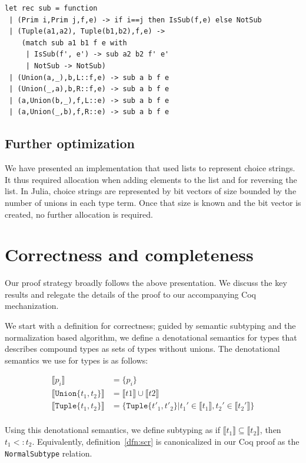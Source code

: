 \documentclass[a4paper,english]{lipics-v2019}
\newcommand{\xt}[1]{\texttt{#1}}
\newcommand{\tuplet}[2]{\xt{Tuple\{}#1,#2\xt{\}}}
\newcommand{\union}[2]{\xt{Union\{}#1,#2\xt{\}}}
\newcommand{\denotes}[1]{\llbracket #1 \rrbracket}
\begin{document}
\begin{lstlisting}
let rec sub = function
 | (Prim i,Prim j,f,e) -> if i==j then IsSub(f,e) else NotSub
 | (Tuple(a1,a2), Tuple(b1,b2),f,e) ->
    (match sub a1 b1 f e with
     | IsSub(f', e') -> sub a2 b2 f' e'
     | NotSub -> NotSub)
 | (Union(a,_),b,L::f,e) -> sub a b f e
 | (Union(_,a),b,R::f,e) -> sub a b f e
 | (a,Union(b,_),f,L::e) -> sub a b f e
 | (a,Union(_,b),f,R::e) -> sub a b f e
\end{lstlisting}

\subsection{Further optimization}

We have presented an implementation that used lists to represent choice
strings. It thus required allocation when adding elements to the list and
for reversing the list. In Julia, choice strings are represented by bit
vectors of size bounded by the number of unions in each type term.  Once
that size is known and the bit vector is created, no further allocation is
required.

\section{Correctness and completeness}

Our proof strategy broadly follows the above presentation.  We discuss the
key results and relegate the details of the proof to our accompanying Coq
mechanization. 

We start with a definition for correctness; guided by semantic subtyping and
the normalization based algorithm, we define a denotational semantics for
types that describes compound types as sets of types without unions.  The
denotational semantics we use for types is as follows:

\vspace{-3mm}
\begin{align*}
\denotes{p_i} &= \{p_i\} \\
\denotes{\union{t_1}{t_2}} &= \denotes{t1} \cup \denotes{t2} \\
\denotes{\tuplet{t_1}{t_2}} &= \{\tuplet{t'_1}{t'_2} | t_1' \in \denotes{t_1},  t_2' \in \denotes{t_2'}\} \\
\end{align*}
\vspace{-3mm}

Using this denotational semantics, we define subtyping as if $\denotes{t_1}
\subseteq \denotes{t_2}$, then $t_1 <: t_2$.  Equivalently,
definition~\ref{dfn:scr} is canonicalized in our Coq proof as the
\verb|NormalSubtype| relation.
\end{document}
